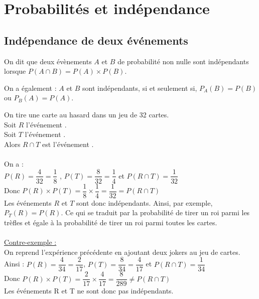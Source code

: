 \section{Probabilités et indépendance}

\subsection{Indépendance de deux événements}

\begin{bdefi}
	On dit que deux évènements $A$ et $B$ de probabilité non nulle sont indépendants lorsque $P(A\cap B)=P(A)\times P(B)$.
\end{bdefi}

\begin{brmq}
	On a également :
$A$ et $B$ sont indépendants, si et seulement si, $P_A (B)=P(B)$ ou $P_B (A)=P(A)$.
\end{brmq}

\begin{bexemple}
	On tire une carte au hasard dans un jeu de 32 cartes.\\
    Soit $R$ l'événement .\\
    Soit $T$ l'événement .\\
    Alors $R\cap T$ est l'événement .\\
    \ \\
    On a :\\
    $P(R)  = \dfrac{4}{32} = \dfrac{1}{8}$ , $P(T)= \dfrac{8}{32} = \dfrac{1}{4}$ et $P(R\cap T)= \dfrac{1}{32}$\\ 
    Donc $P(R)\times P(T)  = \dfrac{1}{8} \times \dfrac{1}{4} = \dfrac{1}{32} = P(R\cap T)$\\
    Les événements $R$ et $T$ sont donc indépendants.
    Ainsi, par exemple, $P_T (R)=P(R)$. Ce qui se traduit par la probabilité de tirer un roi parmi les trèfles et égale à la probabilité de tirer un roi parmi toutes les cartes.\\
    \\
    \underline{Contre-exemple :}\\
    On reprend l'expérience précédente en ajoutant deux jokers au jeu de cartes.\\
    Ainsi :
    $P(R)  = \dfrac{4}{34} = \dfrac{2}{17}$, $P(T)= \dfrac{8}{34} = \dfrac{4}{17}$ et $P(R\cap T)= \dfrac{1}{34}$\\
    Donc $P(R)\times P(T)  = \dfrac{2}{17} \times \dfrac{4}{17} = \dfrac{8}{289} \neq P(R\cap T)$\\
    Les événements R et T ne sont donc pas indépendants.
\end{bexemple}

